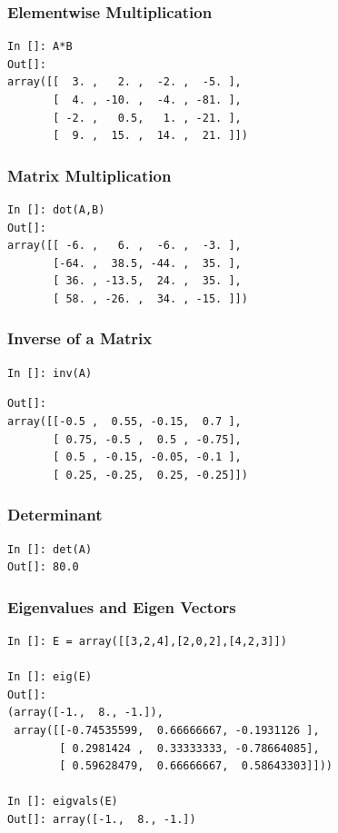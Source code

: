 \documentclass[14pt,compress]{beamer}
\begin{document}
\begin{frame}[fragile]
\frametitle{Elementwise Multiplication}
\begin{lstlisting}
In []: A*B
Out[]: 
array([[  3. ,   2. ,  -2. ,  -5. ],
       [  4. , -10. ,  -4. , -81. ],
       [ -2. ,   0.5,   1. , -21. ],
       [  9. ,  15. ,  14. ,  21. ]])

\end{lstlisting}
\end{frame}

\begin{frame}[fragile]
\frametitle{Matrix Multiplication}
\begin{lstlisting}
In []: dot(A,B)
Out[]: 
array([[ -6. ,   6. ,  -6. ,  -3. ],
       [-64. ,  38.5, -44. ,  35. ],
       [ 36. , -13.5,  24. ,  35. ],
       [ 58. , -26. ,  34. , -15. ]])
\end{lstlisting}
\end{frame}

\begin{frame}[fragile]
\frametitle{Inverse of a Matrix}
\begin{lstlisting}
In []: inv(A)
\end{lstlisting}
\begin{small}
\begin{lstlisting}
Out[]: 
array([[-0.5 ,  0.55, -0.15,  0.7 ],
       [ 0.75, -0.5 ,  0.5 , -0.75],
       [ 0.5 , -0.15, -0.05, -0.1 ],
       [ 0.25, -0.25,  0.25, -0.25]])
\end{lstlisting}
\end{small}
\end{frame}

\begin{frame}[fragile]
\frametitle{Determinant}
\begin{lstlisting}
In []: det(A)
Out[]: 80.0
\end{lstlisting}
\end{frame}

\begin{frame}[fragile]
\frametitle{Eigenvalues and Eigen Vectors}
\begin{small}
\begin{lstlisting}
In []: E = array([[3,2,4],[2,0,2],[4,2,3]])

In []: eig(E)
Out[]: 
(array([-1.,  8., -1.]),
 array([[-0.74535599,  0.66666667, -0.1931126 ],
        [ 0.2981424 ,  0.33333333, -0.78664085],
        [ 0.59628479,  0.66666667,  0.58643303]]))

In []: eigvals(E)
Out[]: array([-1.,  8., -1.])
\end{lstlisting}
\end{small}
\end{frame}
\end{document}

